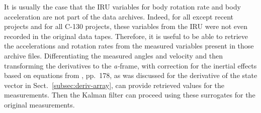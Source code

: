 \documentclass[12pt,twoside,english,12pt,twoside,english]{article}\usepackage[]{graphicx}\usepackage[]{color}
\let\OrgIndex\index
\renewcommand*{\index}[1]{\OrgIndex{#1}}
\begin{document}
It
is usually the case that the IRU variables
for body rotation rate
and body acceleration are not part
of the data archives. Indeed, for all
except recent projects and for all C-130 projects, these variables
from the IRU were not even recorded in the original data tapes. Therefore,
it is useful to be able to retrieve
the accelerations and rotation rates from the measured variables present
in those archive files. Differentiating the measured
angles
and velocity and then transforming
the derivatives to the \emph{a-}frame,
with correction for the inertial effects
based on equations from \citet{noureldin2013fundamentals}, pp.~178,
as was discussed for the derivative of the state vector in Sect.~\ref{subsec:deriv-array},
can provide retrieved values for the measurements. Then the Kalman
filter can proceed using these surrogates for
the original measurements.
\end{document}
